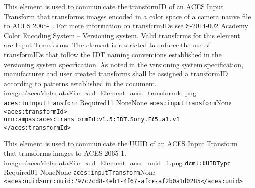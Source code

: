         {This element is used to communicate the transformID of an ACES Input Transform that transforms images encoded in a color space of a camera native file to ACES 2065-1.  For more information on transformIDs see S-2014-002 Academy Color Encoding System -- Versioning system.  Valid transforms for this element are Input Transforms.  The element is restricted to enforce the use of transformIDs that follow the IDT naming conventions established in the versioning system specification.  As noted in the versioning system specification, manufacturer and user created transforms shall be assigned a transformID according to patterns established in the document.}
        {images/acesMetadataFile_xsd_Element_aces_transformId.png}
        {\texttt{aces:tnInputTransform}}
        {Required}{1}{1}
        {None}{None}
        {\texttt{aces:inputTransform}}{None}
        {\lstinline{<aces:transformId>} \\
        \lstinline{urn:ampas:aces:transformId:v1.5:IDT.Sony.F65.a1.v1} \\
        \lstinline{</aces:transformId>}}
        
		{This element is used to communicate the UUID of an ACES Input Transform that transforms images to ACES 2065-1.}
		{images/acesMetadataFile_xsd_Element_aces_uuid_1.png}
		{\texttt{dcml:UUIDType}}
		{Required}{0}{1}
		{None}{None}
		{\texttt{aces:inputTransform}}{None}
		{\lstinline{<aces:uuid>urn:uuid:797c7cd8-4eb1-4f67-afce-af2b0a1d0285</aces:uuid>}}
		
